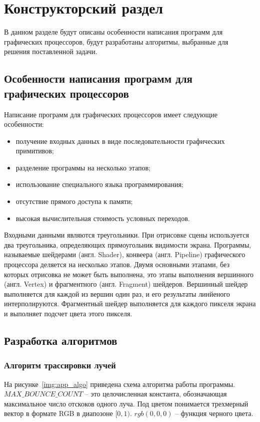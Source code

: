 \chapter{Конструкторский раздел}

В данном разделе будут описаны особенности написания программ для графических процессоров, 
будут разработаны алгоритмы, выбранные для решения поставленной задачи.

\section{Особенности написания программ для графических процессоров}

Написание программ для графических процессоров имеет следующие особенности:
\begin{itemize}
    \item получение входных данных в виде последовательности графических примитивов;
    \item разделение программы на несколько этапов;
    \item использование специального языка программирования;
    \item отсутствие прямого доступа к памяти;
    \item высокая вычислительная стоимость условных переходов.
\end{itemize}

Входными данными являются треугольники. При отрисовке сцены используется два треугольника,
определяющих прямоугольник видимости экрана.
Программы, называемые шейдерами (англ. Shader), конвеера (англ. Pipeline) 
графического процессора деляется на несколько этапов. Двумя основными этапами, 
без которых отрисовка не может быть выполнена, это этапы выполнения вершинного (англ. Vertex) и 
фрагментного (англ. Fragment) шейдеров. Вершинный шейдер выполняется для каждой из вершин один
раз, и его результаты линйеного интерполируются. Фрагментный шейдер
выполняется для каждого пикселя экрана и выполняет подсчет цвета этого пикселя.

\section{Разработка алгоритмов}

\subsection{Алгоритм трассировки лучей}

На рисунке~\ref{img:app_algo} приведена схема алгоритма работы программы.
$MAX\_BOUNCE\_COUNT$ -- это целочисленная константа, обозначающая максимальное число
отскоков одного луча. Под цветом понимается
трехмерный вектор в формате RGB в диапозоне $[0, 1)$. $rgb(0,0,0)$ -- функция черного цвета. 

